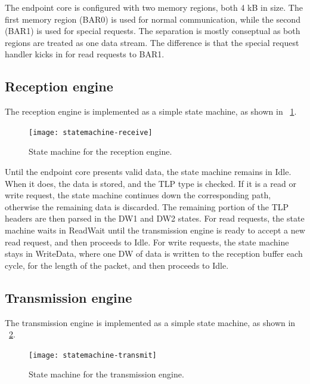 The endpoint core is configured with two memory regions, both 4 kB in size\footnotemark.
The first memory region (BAR0) is used for normal communication, while the second (BAR1) is used for special requests.
The separation is mostly conseptual as both regions are treated as one data stream.
The difference is that the special request handler kicks in for read requests to BAR1.

\subsection{Reception engine}

The reception engine is implemented as a simple state machine, as shown in \figurename~\ref{fig:statemachine-receive}.

\begin{figure}[!ht]
    \centering
    \texttt{[image: statemachine-receive]}
    \caption[Reception engine state machine]{
        State machine for the reception engine.
    }
    \label{fig:statemachine-receive}
\end{figure}

Until the endpoint core presents valid data, the state machine remains in Idle.
When it does, the data is stored, and the TLP type is checked.
If it is a read or write request, the state machine continues down the corresponding path, otherwise the remaining data is discarded.
The remaining portion of the TLP headers are then parsed in the DW1 and DW2 states.
For read requests, the state machine waits in ReadWait until the transmission engine is ready to accept a new read request, and then proceeds to Idle.
For write requests, the state machine stays in WriteData, where one DW of data is written to the reception buffer each cycle, for the length of the packet, and then proceeds to Idle.

\subsection{Transmission engine}

The transmission engine is implemented as a simple state machine, as shown in \figurename~\ref{fig:statemachine-transmit}.

\begin{figure}[!ht]
    \centering
    \texttt{[image: statemachine-transmit]}
    \caption[Transmission engine state machine]{
        State machine for the transmission engine.
    }
    \label{fig:statemachine-transmit}
\end{figure}

